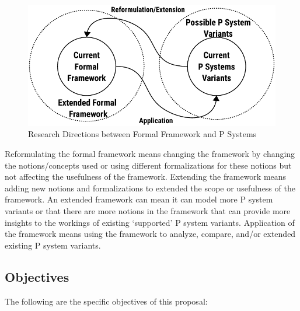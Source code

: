 \documentclass{article}
\begin{document}
\begin{figure}[H]
\begin{center}
\includegraphics[scale=0.80]{figures/zzz-ff-p-system.pdf}
\caption{Research Directions between Formal Framework and P Systems}
\label{fig:ff-p-system}
\end{center}
\end{figure}

Reformulating the formal framework means changing the framework by changing the notions/concepts 
used or using different formalizations for these notions but not affecting the usefulness of the 
framework. Extending the framework means adding new notions and formalizations to extended the 
scope or usefulness of the framework. An extended framework can mean it can model more P system
variants or that there are more notions in the framework that can provide more insights to the 
workings of existing `supported' P system variants. Application of the framework means using the 
framework to analyze, compare, and/or extended existing P system variants. 

\subsection{Objectives}

The following are the specific objectives of this proposal:
\end{document}
